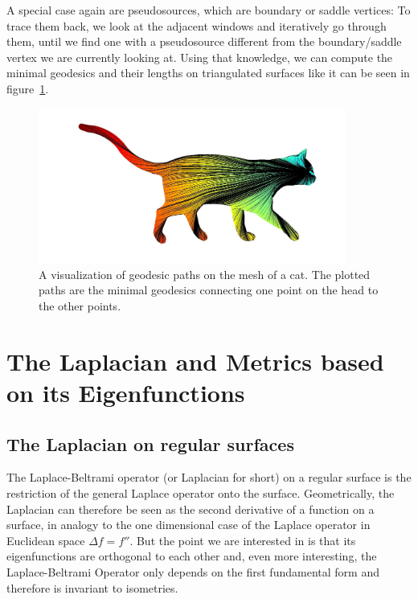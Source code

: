 A special case again are pseudosources, which are boundary or saddle vertices:
To trace them back, we look at the adjacent windows and iteratively go through them, until we find one with a pseudosource different from the boundary/saddle vertex we are currently looking at.
Using that knowledge, we can compute the minimal geodesics and their lengths on triangulated surfaces like it can be seen in figure~\ref{fig:geo_paths}.
\begin{figure}[h]
	\centering
	\includegraphics[width = 0.9\textwidth]{pictures/cat_geodesic_paths}
	\caption{A visualization of geodesic paths on the mesh of a cat. The plotted paths are the minimal geodesics connecting one point on the head to the other points.}
	\label{fig:geo_paths}
\end{figure}

\section{The Laplacian and Metrics based on its Eigenfunctions}
\subsection{The Laplacian on regular surfaces}
The Laplace-Beltrami operator (or Laplacian for short) on a regular surface is the restriction of the general Laplace operator onto the surface.
Geometrically, the Laplacian can therefore be seen as the second derivative of a function on a surface, in analogy to the one dimensional case of the Laplace operator in Euclidean space $\Delta f = f''$.
But the point we are interested in is that its eigenfunctions are orthogonal to each other and, even more interesting, the Laplace-Beltrami Operator only depends on the first fundamental form and therefore is invariant to isometries.

